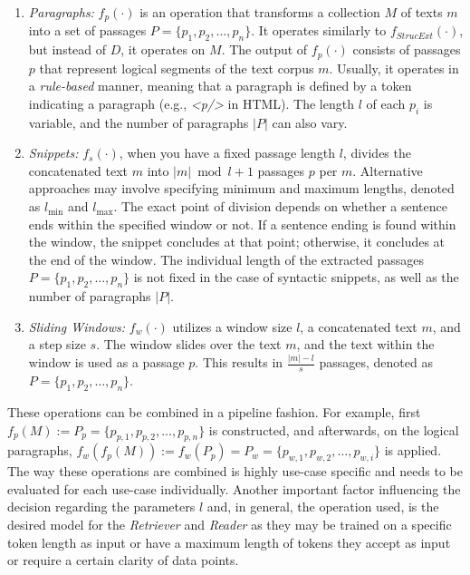 \begin{enumerate}
    \item \textit{Paragraphs:} $f_p(\cdot)$ is an operation that transforms a collection $M$ of texts $m$ into a set of passages $P = \{p_1, p_2, \dots, p_n\}$. It operates similarly to $f_{StrucExt}(\cdot)$, but instead of $D$, it operates on $M$. The output of $f_p(\cdot)$ consists of passages $p$ that represent logical segments of the text corpus $m$. Usually, it operates in a \textit{rule-based} manner, meaning that a paragraph is defined by a token indicating a paragraph (e.g., \textit{<p/>} in HTML). The length $l$ of each $p_i$ is variable, and the number of paragraphs $|P|$ can also vary.
    \item \textit{Snippets:} $f_s(\cdot)$, when you have a fixed passage length $l$, divides the concatenated text $m$ into $|m|\bmod{l} + 1$ passages $p$ per $m$. Alternative approaches may involve specifying minimum and maximum lengths, denoted as $l_{\text{min}}$ and $l_{\text{max}}$. The exact point of division depends on whether a sentence ends within the specified window or not. If a sentence ending is found within the window, the snippet concludes at that point; otherwise, it concludes at the end of the window. The individual length of the extracted passages $P = \{p_1, p_2, \ldots, p_n\}$ is not fixed in the case of syntactic snippets, as well as the number of paragraphs $|P|$.
    \item \textit{Sliding Windows:} $f_w(\cdot)$ utilizes a window size $l$, a concatenated text $m$, and a step size $s$. The window slides over the text $m$, and the text within the window is used as a passage $p$. This results in $\frac{|m| - l}{s}$ passages, denoted as $P = \{p_1, p_2, \ldots, p_n\}$.
\end{enumerate}

These operations can be combined in a pipeline fashion. For example, first $f_p(M) := P_p = \{p_{p,1}, p_{p,2}, \dots, p_{p,n}\}$ is constructed, and afterwards, on the logical paragraphs, $f_w(f_p(M)) := f_w(P_p) = P_w = \{p_{w,1}, p_{w,2}, \dots, p_{w,i}\}$ is applied. The way these operations are combined is highly use-case specific and needs to be evaluated for each use-case individually. Another important factor influencing the decision regarding the parameters $l$ and, in general, the operation used, is the desired model for the \textit{Retriever} and \textit{Reader} as they may be trained on a specific token length as input or have a maximum length of tokens they accept as input or require a certain clarity of data points.


